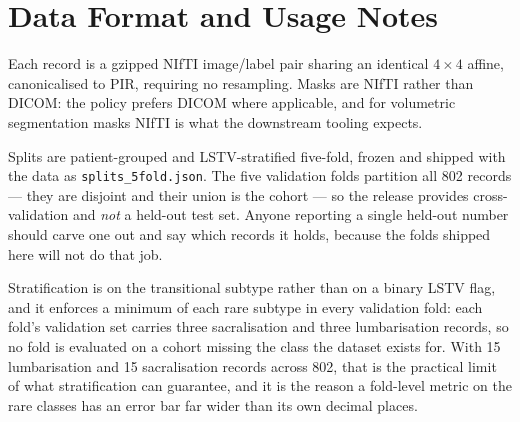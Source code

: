 \documentclass[aapm,mph,amsmath,amssymb,reprint,linenumbers]{revtex4-2}
\begin{document}
\section{Data Format and Usage Notes}\label{sec:format}

Each record is a gzipped NIfTI image/label pair sharing an identical $4\times4$ affine,
canonicalised to PIR, requiring no resampling. Masks are NIfTI rather than DICOM: the
policy prefers DICOM where applicable, and for volumetric segmentation masks NIfTI is
what the downstream tooling expects.

Splits are patient-grouped and LSTV-stratified five-fold, frozen and shipped with the data
as \texttt{splits\_5fold.json}. The five validation folds partition all 802 records ---
they are disjoint and their union is the cohort --- so the release provides
cross-validation and \emph{not} a held-out test set. Anyone reporting a single held-out
number should carve one out and say which records it holds, because the folds shipped here
will not do that job.

Stratification is on the transitional subtype rather than on a binary LSTV flag, and it
enforces a minimum of each rare subtype in every validation fold: each fold's validation
set carries three sacralisation and three lumbarisation records, so no fold is evaluated on
a cohort missing the class the dataset exists for. With 15 lumbarisation and 15
sacralisation records across 802, that is the practical limit of what stratification can
guarantee, and it is the reason a fold-level metric on the rare classes has an error bar
far wider than its own decimal places.
\end{document}

